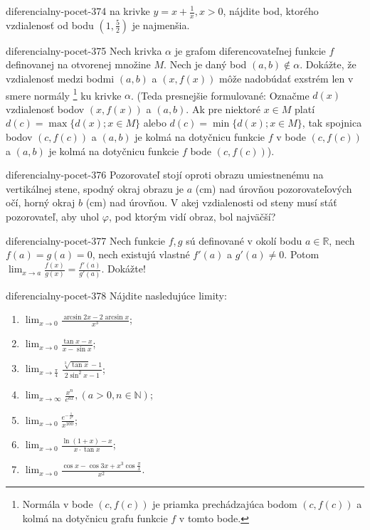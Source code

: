 \begin{defproblem}{diferencialny-pocet-374}
na krivke $y=x+\frac{1}{x},x>0$, nájdite bod, ktorého vzdialenosť od bodu $(1,\frac{5}{2})$ je najmenšia.
\end{defproblem}

\begin{defproblem}{diferencialny-pocet-375}
Nech krivka $\alpha$ je grafom diferencovateľnej funkcie $f$ definovanej na otvorenej množine $M$. Nech je daný bod $(a,b)\notin \alpha$. Dokážte, že vzdialenosť medzi bodmi $(a,b)$ a $(x,f(x))$ môže nadobúdať exstrém len v smere normály \footnote{Normála v bode $(c,f(c))$ je priamka prechádzajúca bodom $(c,f(c))$ a kolmá na dotyčnicu grafu funkcie $f$ v tomto bode.} ku krivke $\alpha$. (Teda presnejšie formulované: Označme $d(x)$ vzdialenosť bodov $(x,f(x))$ a $(a,b)$. Ak pre niektoré $x\in M$ platí $d(c)=\max \{d(x);x\in M\}$ alebo $d(c)=\min \{d(x);x\in M\}$, tak spojnica bodov $(c,f(c))$ a $(a,b)$ je kolmá na dotyčnicu funkcie $f$ v bode $(c,f(c))$ a $(a,b)$ je kolmá na dotyčnicu funkcie $f$  bode $(c,f(c))$).
\end{defproblem}

\begin{defproblem}{diferencialny-pocet-376}
Pozorovateľ stojí oproti obrazu umiestnenému na vertikálnej stene, spodný okraj obrazu je $a$ (cm) nad úrovňou pozorovateľových očí, horný okraj $b$ (cm) nad úrovňou. V akej vzdialenosti od steny musí stáť pozorovateľ, aby uhol $\varphi$, pod ktorým vidí obraz, bol najväčší?
\end{defproblem}

\begin{defproblem}{diferencialny-pocet-377}
Nech funkcie $f,g$ sú definované v okolí bodu $a\in\mathbb{R}$, nech $f(a)=g(a)=0$, nech existujú vlastné $f'(a)$ a $g'(a)\neq 0$. Potom $\lim_{x\rightarrow a}\frac{f(x)}{g(x)}=\frac{f'(a)}{g'(a)}$. Dokážte!
\end{defproblem}

\begin{defproblem}{diferencialny-pocet-378}
Nájdite nasledujúce limity:
\begin{multicols}{2}
\begin{enumerate}
    \item $\lim_{x\rightarrow 0}\frac{\arcsin 2x-2\arcsin x}{x^3}$;
	\item $\lim_{x\rightarrow 0}\frac{\tan x-x}{x-\sin x}$;
	\item $\lim_{x\rightarrow \frac{\pi}{4}}\frac{\sqrt[3]{\tan x}-1}{2\sin^2 x -1}$;
	\item $\lim_{x\rightarrow\infty}\frac{x^n}{e^{ax}},(a>0,n\in\mathbb{N})$;
	\item $\lim_{x\rightarrow 0}\frac{e^{-\frac{1}{x^2}}}{x^{100}}$;
	\item $\lim_{x\rightarrow 0}\frac{\ln (1+x)-x}{x\cdot\tan x}$;
	\item $\lim_{x\rightarrow 0}\frac{\cos x-\cos 3x+x^3\cos \frac{\pi}{x}}{x^2}$.
\end{enumerate}
\end{multicols}
\end{defproblem}

